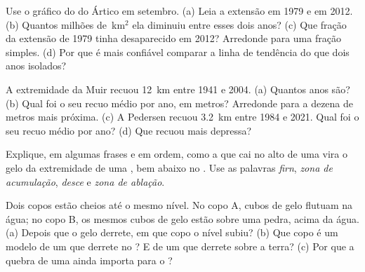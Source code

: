 \begin{exercise}[$\star\star$]\label{exo:g8:ice-on-earth:5}
Use o gráfico do  do Ártico em setembro. (a) Leia a extensão
em 1979 e em 2012. (b) Quantos milhões de~km$^2$ ela diminuiu entre esses
dois anos? (c) Que fração da extensão de 1979 tinha desaparecido em 2012?
Arredonde para uma fração simples. (d) Por que é mais confiável comparar a
linha de tendência do que dois anos isolados?
\end{exercise}

\begin{exercise}[$\star\star$]\label{exo:g8:ice-on-earth:6}
A extremidade da  Muir recuou \qty{12}{km} entre 1941 e 2004.
(a) Quantos anos são? (b) Qual foi o seu recuo médio por ano, em metros?
Arredonde para a dezena de metros mais próxima. (c) A  Pedersen
recuou \qty{3.2}{km} entre 1984 e 2021. Qual foi o seu recuo médio por
ano? (d) Que  recuou mais depressa?
\end{exercise}

\begin{exercise}[$\star\star$]\label{exo:g8:ice-on-earth:7}
Explique, em algumas frases e em ordem, como a  que cai no alto de uma
 vira o gelo da extremidade de uma , bem abaixo no .
Use as palavras \emph{firn}, \emph{zona de acumulação}, \emph{desce} e
\emph{zona de ablação}.
\end{exercise}

\begin{exercise}[$\star\star$]\label{exo:g8:ice-on-earth:8}
Dois copos estão cheios até o mesmo nível. No copo A, cubos de gelo
flutuam na água; no copo B, os mesmos cubos de gelo estão sobre uma pedra,
acima da água. (a) Depois que o gelo derrete, em que copo o nível subiu?
(b) Que copo é um modelo de um  que derrete no ? E de um  que derrete sobre a terra? (c) Por que a quebra de uma  ainda importa para o ?
\end{exercise}

